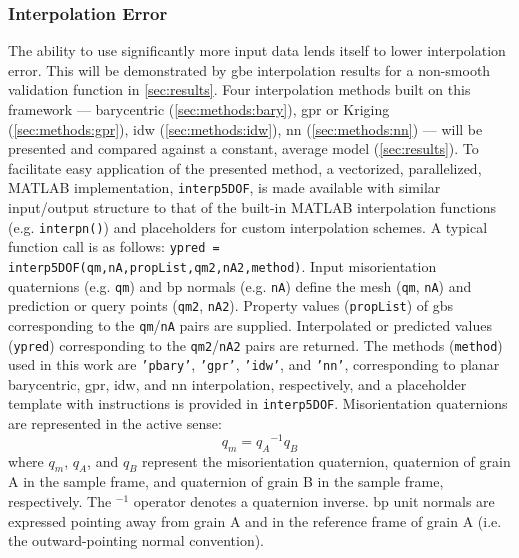 \documentclass[preprint,12pt]{elsarticle}
\begin{document}
\subsubsection{Interpolation Error} \label{sec:intro:interp-error}
The ability to use significantly more input data lends itself to lower interpolation error. This will be demonstrated by \gls{gbe} interpolation results for a non-smooth validation function in \cref{sec:results}.
Four interpolation methods built on this framework --- barycentric (\cref{sec:methods:bary}), \gls{gpr} or Kriging (\cref{sec:methods:gpr}), \gls{idw} (\cref{sec:methods:idw}), \gls{nn} (\cref{sec:methods:nn}) --- will be presented and compared against a constant, average model (\cref{sec:results}). To facilitate easy application of the presented method, a vectorized, parallelized, MATLAB implementation, \texttt{interp5DOF}, is made available \cite{bairdFiveDegreeofFreedom5DOF2020} with similar input/output structure to that of the built-in MATLAB interpolation functions (e.g. \texttt{interpn()}) and placeholders for custom interpolation schemes. A typical function call is as follows: \texttt{ypred = interp5DOF(qm,nA,propList,qm2,nA2,method)}. Input misorientation quaternions (e.g. \texttt{qm}) and \gls{bp} normals (e.g. \texttt{nA}) define the mesh (\texttt{qm}, \texttt{nA}) and prediction or query points (\texttt{qm2}, \texttt{nA2}). Property values (\texttt{propList}) of \glspl{gb} corresponding to the \texttt{qm}/\texttt{nA} pairs are supplied. Interpolated or predicted values (\texttt{ypred}) corresponding to the \texttt{qm2}/\texttt{nA2} pairs are returned. The methods (\texttt{method}) used in this work are \texttt{'pbary'}, \texttt{'gpr'}, \texttt{'idw'}, and \texttt{'nn'}, corresponding to planar barycentric, \gls{gpr}, \gls{idw}, and \gls{nn} interpolation, respectively, and a placeholder template with instructions is provided in \texttt{interp5DOF}. Misorientation quaternions are represented in the active sense:
\begin{equation}
    q_m = {q_A}^{-1}q_B
\end{equation}
where $q_m$, $q_A$, and $q_B$ represent the misorientation quaternion, quaternion of grain A in the sample frame, and quaternion of grain B in the sample frame, respectively. The $^{-1}$ operator denotes a quaternion inverse. \Gls{bp} unit normals are expressed pointing away from grain A and in the reference frame of grain A (i.e. the outward-pointing normal convention).
\end{document}
